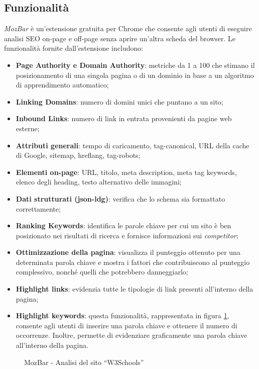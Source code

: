 \subsection{Funzionalità}
\par \textit{MozBar} è un'estensione gratuita per Chrome che consente agli utenti di eseguire analisi SEO \gls{on-page} e \gls{off-page} senza aprire un'altra scheda del browser. Le funzionalità fornite dall'estensione includono:
\begin{itemize}
    \item \textbf{Page Authority e Domain Authority}: metriche da 1 a 100 che stimano il posizionamento di una singola pagina o di un dominio in base a un algoritmo di apprendimento automatico;
    \item \textbf{Linking Domains}: numero di domini unici che puntano a un sito;
    \item \textbf{Inbound Links}: numero di link in entrata provenienti da pagine web esterne;
    \item \textbf{Attributi generali}: tempo di caricamento, \gls{tag-canonical}, URL della cache di Google, \gls{sitemap}, \gls{hreflang}, \gls{tag-robots};
    \item \textbf{Elementi on-page}: URL, titolo, meta description, meta tag keywords, elenco degli heading, testo alternativo delle immagini;
    \item \textbf{Dati strutturati (\gls{json-ldg})}: verifica che lo schema sia formattato correttamente;
    \item \textbf{Ranking Keywords}: identifica le parole chiave per cui un sito è ben posizionato nei risultati di ricerca e fornisce informazioni sui \textit{competitor};
    \item \textbf{Ottimizzazione della pagina}: visualizza il punteggio ottenuto per una determinata parola chiave e mostra i fattori che contribuiscono al punteggio complessivo, nonché quelli che potrebbero danneggiarlo;
    \item \textbf{Highlight links}: evidenzia tutte le tipologie di link presenti all'interno della pagina;
    \item \textbf{Highlight keywords}: questa funzionalità, rappresentata in figura \ref{fig:mozbar}, consente agli utenti di inserire una parola chiave e ottenere il numero di occorrenze. Inoltre, permette di evidenziare graficamente una parola chiave all'interno della pagina.
\end{itemize}

\begin{figure}[H]
    \centering 
    \caption{MozBar - Analisi del sito “W3Schools”}
    \label{fig:mozbar}
\end{figure}

